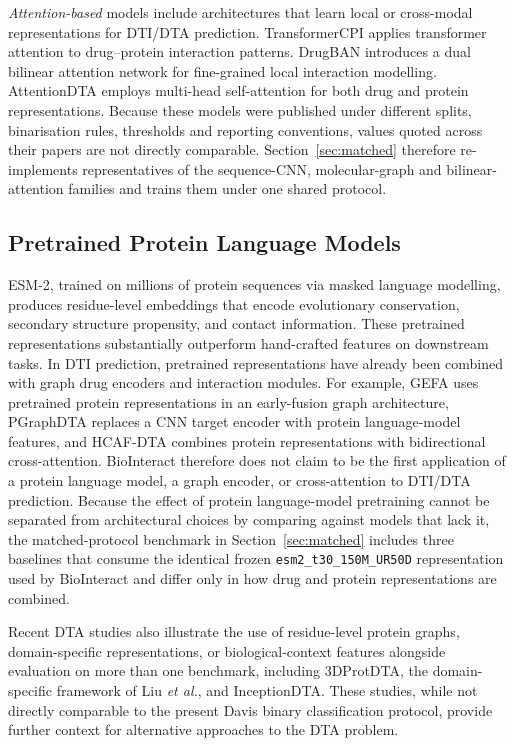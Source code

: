\documentclass[fleqn,10pt]{wlscirep}
\begin{document}
\emph{Attention-based} models include architectures that learn local or
cross-modal representations for DTI/DTA prediction.
TransformerCPI\cite{chen2020transformercpi} applies transformer attention to
drug--protein interaction patterns.  DrugBAN\cite{bai2023drugban} introduces
a dual bilinear attention network for fine-grained local interaction modelling.
AttentionDTA\cite{zhao2022attentiondta} employs multi-head self-attention for
both drug and protein representations.
\begingroup\color{red}
Because these models were published under different splits, binarisation rules,
thresholds and reporting conventions, values quoted across their papers are not
directly comparable.  Section~\ref{sec:matched} therefore re-implements
representatives of the sequence-CNN, molecular-graph and bilinear-attention
families and trains them under one shared protocol.
\endgroup

\subsection{Pretrained Protein Language Models}

ESM-2,\cite{lin2023evolutionary} trained on millions of protein sequences
via masked language modelling, produces residue-level embeddings that encode
evolutionary conservation, secondary structure propensity, and contact
information.  These pretrained representations substantially outperform
hand-crafted features on downstream tasks.\cite{rives2021biological}  In DTI
prediction, pretrained representations have already been combined with graph
drug encoders and interaction modules.  For example, GEFA uses pretrained
protein representations in an early-fusion graph architecture,\cite{nguyen2022gefa}
PGraphDTA replaces a CNN target encoder with protein language-model features,
\cite{bal2023pgraphdta} and HCAF-DTA combines protein representations with
bidirectional cross-attention.\cite{li2025hcafdta}  BioInteract therefore does
not claim to be the first application of a protein language model, a graph
encoder, or cross-attention to DTI/DTA prediction.
\begingroup\color{red}
Because the effect of protein language-model pretraining cannot be separated
from architectural choices by comparing against models that lack it, the
matched-protocol benchmark in Section~\ref{sec:matched} includes three
baselines that consume the identical frozen \texttt{esm2\_t30\_150M\_UR50D}
representation used by BioInteract and differ only in how drug and protein
representations are combined.
\endgroup

Recent DTA studies also illustrate the use of residue-level protein graphs,
domain-specific representations, or biological-context features alongside
evaluation on more than one benchmark, including 3DProtDTA,\cite{voitsitskyi2023_3dprotdta}
the domain-specific framework of Liu \textit{et al.},\cite{liu2024domainspecific}
and InceptionDTA.\cite{kalemati2025inceptiondta}
\begingroup\color{red}
These studies, while not directly comparable to the present Davis binary
classification protocol, provide further context for alternative approaches to
the DTA problem.
\endgroup
\end{document}
